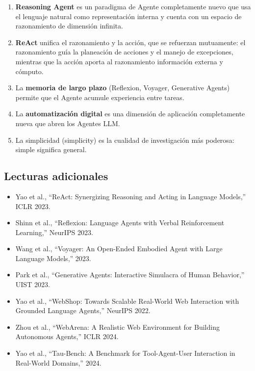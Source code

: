 \documentclass[a4paper]{article}
\begin{document}
\begin{enumerate}
    \item \textbf{Reasoning Agent} es un paradigma de Agente completamente nuevo que usa el lenguaje natural como representación interna y cuenta con un espacio de razonamiento de dimensión infinita.
    \item \textbf{ReAct} unifica el razonamiento y la acción, que se refuerzan mutuamente: el razonamiento guía la planeación de acciones y el manejo de excepciones, mientras que la acción aporta al razonamiento información externa y cómputo.
    \item La \textbf{memoria de largo plazo} (Reflexion, Voyager, Generative Agents) permite que el Agente acumule experiencia entre tareas.
    \item La \textbf{automatización digital} es una dimensión de aplicación completamente nueva que abren los Agentes LLM.
    \item La simplicidad (simplicity) es la cualidad de investigación más poderosa: simple significa general.
\end{enumerate}

\subsection{Lecturas adicionales}

\begin{itemize}
    \item Yao et al., ``ReAct: Synergizing Reasoning and Acting in Language Models,'' ICLR 2023.
    \item Shinn et al., ``Reflexion: Language Agents with Verbal Reinforcement Learning,'' NeurIPS 2023.
    \item Wang et al., ``Voyager: An Open-Ended Embodied Agent with Large Language Models,'' 2023.
    \item Park et al., ``Generative Agents: Interactive Simulacra of Human Behavior,'' UIST 2023.
    \item Yao et al., ``WebShop: Towards Scalable Real-World Web Interaction with Grounded Language Agents,'' NeurIPS 2022.
    \item Zhou et al., ``WebArena: A Realistic Web Environment for Building Autonomous Agents,'' ICLR 2024.
    \item Yao et al., ``Tau-Bench: A Benchmark for Tool-Agent-User Interaction in Real-World Domains,'' 2024.
\end{itemize}

\end{document}
